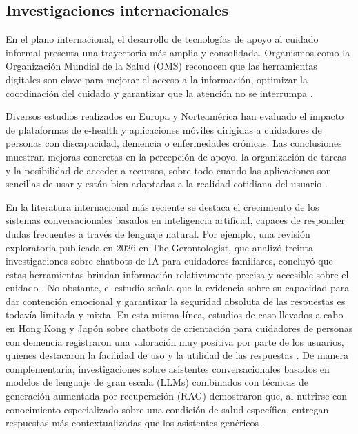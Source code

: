 \subsection{Investigaciones internacionales}

En el plano internacional, el desarrollo de tecnologías de apoyo al cuidado informal presenta una trayectoria más amplia y consolidada. Organismos como la Organización Mundial de la Salud (OMS) reconocen que las herramientas digitales son clave para mejorar el acceso a la información, optimizar la coordinación del cuidado y garantizar que la atención no se interrumpa \citep{who2022}.

Diversos estudios realizados en Europa y Norteamérica han evaluado el impacto de plataformas de e-health y aplicaciones móviles dirigidas a cuidadores de personas con discapacidad, demencia o enfermedades crónicas. Las conclusiones muestran mejoras concretas en la percepción de apoyo, la organización de tareas y la posibilidad de acceder a recursos, sobre todo cuando las aplicaciones son sencillas de usar y están bien adaptadas a la realidad cotidiana del usuario \citep{schwedler2025}.

En la literatura internacional más reciente se destaca el crecimiento de los sistemas conversacionales basados en inteligencia artificial, capaces de responder dudas frecuentes a través de lenguaje natural. Por ejemplo, una revisión exploratoria publicada en 2026 en The Gerontologist, que analizó treinta investigaciones sobre chatbots de IA para cuidadores familiares, concluyó que estas herramientas brindan información relativamente precisa y accesible sobre el cuidado \citep{gallagher2026}. No obstante, el estudio señala que la evidencia sobre su capacidad para dar contención emocional y garantizar la seguridad absoluta de las respuestas es todavía limitada y mixta. En esta misma línea, estudios de caso llevados a cabo en Hong Kong y Japón sobre chatbots de orientación para cuidadores de personas con demencia registraron una valoración muy positiva por parte de los usuarios, quienes destacaron la facilidad de uso y la utilidad de las respuestas \citep{cheng2024}. De manera complementaria, investigaciones sobre asistentes conversacionales basados en modelos de lenguaje de gran escala (LLMs) combinados con técnicas de generación aumentada por recuperación (RAG) demostraron que, al nutrirse con conocimiento especializado sobre una condición de salud específica, entregan respuestas más contextualizadas que los asistentes genéricos \citep{hasan2024}.


